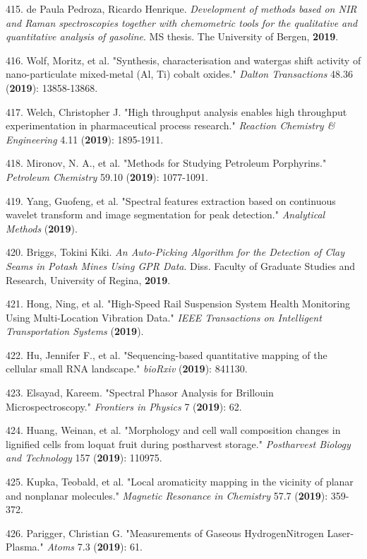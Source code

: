 415. de Paula Pedroza, Ricardo Henrique. \textit{Development of methods based on NIR and Raman spectroscopies together with chemometric tools for the qualitative and quantitative analysis of gasoline}. MS thesis. The University of Bergen, \textbf{2019}.

416. Wolf, Moritz, et al. "Synthesis, characterisation and water\textendash{}gas shift activity of nano-particulate mixed-metal (Al, Ti) cobalt oxides." \textit{Dalton Transactions} 48.36 (\textbf{2019}): 13858-13868.

417. Welch, Christopher J. "High throughput analysis enables high throughput experimentation in pharmaceutical process research." \textit{Reaction Chemistry \& Engineering} 4.11 (\textbf{2019}): 1895-1911.

418. Mironov, N. A., et al. "Methods for Studying Petroleum Porphyrins." \textit{Petroleum Chemistry} 59.10 (\textbf{2019}): 1077-1091.

419. Yang, Guofeng, et al. "Spectral features extraction based on continuous wavelet transform and image segmentation for peak detection." \textit{Analytical Methods} (\textbf{2019}).

420. Briggs, Tokini Kiki. \textit{An Auto-Picking Algorithm for the Detection of Clay Seams in Potash Mines Using GPR Data}. Diss. Faculty of Graduate Studies and Research, University of Regina, \textbf{2019}.

421. Hong, Ning, et al. "High-Speed Rail Suspension System Health Monitoring Using Multi-Location Vibration Data." \textit{IEEE Transactions on Intelligent Transportation Systems} (\textbf{2019}).

422. Hu, Jennifer F., et al. "Sequencing-based quantitative mapping of the cellular small RNA landscape." \textit{bioRxiv} (\textbf{2019}): 841130.

423. Elsayad, Kareem. "Spectral Phasor Analysis for Brillouin Microspectroscopy." \textit{Frontiers in Physics} 7 (\textbf{2019}): 62.

424. Huang, Weinan, et al. "Morphology and cell wall composition changes in lignified cells from loquat fruit during postharvest storage." \textit{Postharvest Biology and Technology} 157 (\textbf{2019}): 110975.

425. Kupka, Teobald, et al. "Local aromaticity mapping in the vicinity of planar and nonplanar molecules." \textit{Magnetic Resonance in Chemistry} 57.7 (\textbf{2019}): 359-372.

426. Parigger, Christian G. "Measurements of Gaseous Hydrogen\textendash{}Nitrogen Laser-Plasma." \textit{Atoms} 7.3 (\textbf{2019}): 61.

